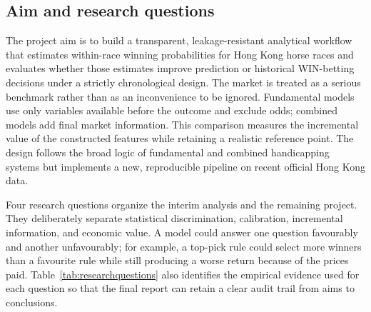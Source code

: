 \subsection{Aim and research questions}\label{sec:aim}
The project aim is to build a transparent, leakage-resistant analytical workflow that estimates within-race winning probabilities for Hong Kong horse races and evaluates whether those estimates improve prediction or historical WIN-betting decisions under a strictly chronological design. The market is treated as a serious benchmark rather than as an inconvenience to be ignored. Fundamental models use only variables available before the outcome and exclude odds; combined models add final market information. This comparison measures the incremental value of the constructed features while retaining a realistic reference point. The design follows the broad logic of fundamental and combined handicapping systems but implements a new, reproducible pipeline on recent official Hong Kong data\cite{benter1994,chapman1994}.

Four research questions organize the interim analysis and the remaining project. They deliberately separate statistical discrimination, calibration, incremental information, and economic value. A model could answer one question favourably and another unfavourably; for example, a top-pick rule could select more winners than a favourite rule while still producing a worse return because of the prices paid. Table~\ref{tab:researchquestions} also identifies the empirical evidence used for each question so that the final report can retain a clear audit trail from aims to conclusions.

